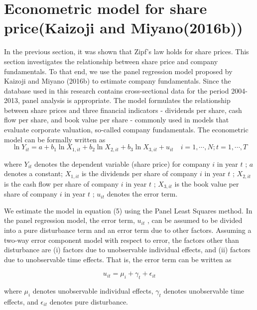 \documentclass[10pt,a4paper]{article}
\begin{document}
\section{Econometric model for share price(Kaizoji and Miyano(2016b))}
In the previous section, it was shown that Zipf's law holds for share prices. This section investigates the relationship between share price and company fundamentals. To that end, we use the panel regression model proposed by Kaizoji and Miyano (2016b) to estimate company fundamentals. Since the database used in this research contains cross-sectional data for the period 2004-2013, panel analysis is appropriate. The model formulates the relationship between share prices and three financial indicators - dividends per share, cash flow per share, and book value per share - commonly used in models that evaluate corporate valuation, so-called company fundamentals. The econometric model can be formally written as 
\begin{equation}
 \ln Y_{it} = a + b_{1}\ln X_{1,it} + b_{2}\ln X_{2,it} + b_{3} \ln X_{3,it} + u_{it}  \quad i=1,\cdots, N;  t=1,\cdots, T
\end{equation} 
%

where $Y_{it}$ denotes the dependent variable (share price) for company $i$   in year $t$ ;  $a$ denotes a constant; $X_{1,it}$ is the dividends per share of company $i$   in year $t$ ; $X_{2,it}$  is the cash flow per share of company $i$  in year $t$  ; $X_{3,it}$  is the book value per share of company $i$  in year $t$ ; $u_{it}$  denotes the error term. 

We estimate the model in equation (5) using the Panel Least Squares method. In the panel regression model, the error term,  $u_{it}$   , can be assumed to be divided into a pure disturbance term and an error term due to other factors. Assuming a two-way error component model with respect to error, the factors other than disturbance are (i) factors due to unobservable individual effects, and (ii) factors due to unobservable time effects. That is, the error term can be written as

\begin{equation}
 u_{it} =\mu_{i} + \gamma_{t} + \epsilon_{it}    
\end{equation} 

where $\mu_{i}$   denotes unobservable individual effects,  $\gamma_{t}$ denotes unobservable time effects, and  $\epsilon_{it}$ denotes pure disturbance. 
\end{document}
